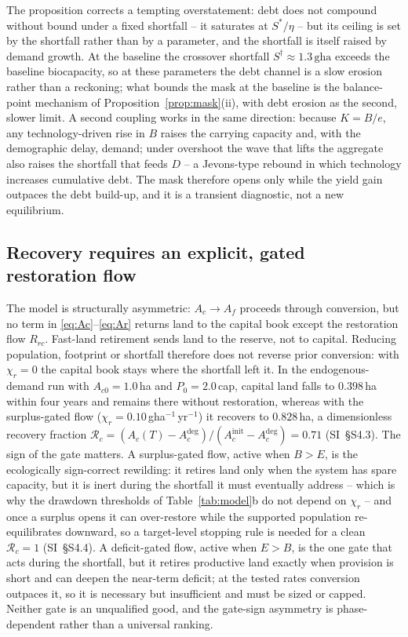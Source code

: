 The proposition corrects a tempting overstatement: debt does not compound without bound under a fixed shortfall -- it saturates at $S^*/\eta$ -- but its ceiling is set by the shortfall rather than by a parameter, and the shortfall is itself raised by demand growth. At the baseline the crossover shortfall $S^\dagger\approx1.3\,\mathrm{gha}$ exceeds the baseline biocapacity, so at these parameters the debt channel is a slow erosion rather than a reckoning; what bounds the mask at the baseline is the balance-point mechanism of Proposition~\ref{prop:mask}(ii), with debt erosion as the second, slower limit. A second coupling works in the same direction: because $K=B/e$, any technology-driven rise in $B$ raises the carrying capacity and, with the demographic delay, demand; under overshoot the wave that lifts the aggregate also raises the shortfall that feeds $D$ -- a Jevons-type rebound in which technology increases cumulative debt. The mask therefore opens only while the yield gain outpaces the debt build-up, and it is a transient diagnostic, not a new equilibrium.

\subsection{Recovery requires an explicit, gated restoration flow}\label{sec:recovery}

The model is structurally asymmetric: $A_c\to A_f$ proceeds through conversion, but no term in \eqref{eq:Ac}--\eqref{eq:Ar} returns land to the capital book except the restoration flow $R_{rc}$. Fast-land retirement sends land to the reserve, not to capital. Reducing population, footprint or shortfall therefore does not reverse prior conversion: with $\chi_r=0$ the capital book stays where the shortfall left it. In the endogenous-demand run with $A_{c0}=1.0$\,ha and $P_0=2.0$\,cap, capital land falls to $0.398$\,ha within four years and remains there without restoration, whereas with the surplus-gated flow ($\chi_r=0.10$\,gha$^{-1}$\,yr$^{-1}$) it recovers to $0.828$\,ha, a dimensionless recovery fraction $\mathcal R_c=(A_c(T)-A_c^{\mathrm{deg}})/(A_c^{\mathrm{init}}-A_c^{\mathrm{deg}})=0.71$ (SI~\S S4.3). The sign of the gate matters. A surplus-gated flow, active when $B>E$, is the ecologically sign-correct rewilding: it retires land only when the system has spare capacity, but it is inert during the shortfall it must eventually address -- which is why the drawdown thresholds of Table~\ref{tab:model}b do not depend on $\chi_r$ -- and once a surplus opens it can over-restore while the supported population re-equilibrates downward, so a target-level stopping rule is needed for a clean $\mathcal R_c=1$ (SI~\S S4.4). A deficit-gated flow, active when $E>B$, is the one gate that acts during the shortfall, but it retires productive land exactly when provision is short and can deepen the near-term deficit; at the tested rates conversion outpaces it, so it is necessary but insufficient and must be sized or capped. Neither gate is an unqualified good, and the gate-sign asymmetry is phase-dependent rather than a universal ranking.

